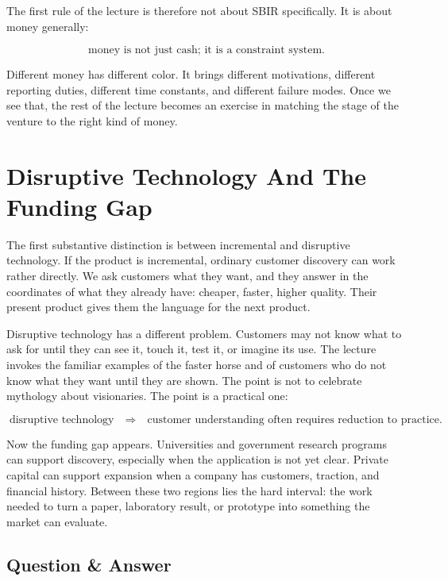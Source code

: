 The first rule of the lecture is therefore not about SBIR specifically. It is about money generally:

\begin{equation}
\text{money is not just cash; it is a constraint system.}
\end{equation}

Different money has different color. It brings different motivations, different reporting duties, different time constants, and different failure modes. Once we see that, the rest of the lecture becomes an exercise in matching the stage of the venture to the right kind of money.

\section{Disruptive Technology And The Funding Gap}

The first substantive distinction is between incremental and disruptive technology. If the product is incremental, ordinary customer discovery can work rather directly. We ask customers what they want, and they answer in the coordinates of what they already have: cheaper, faster, higher quality. Their present product gives them the language for the next product.

Disruptive technology has a different problem. Customers may not know what to ask for until they can see it, touch it, test it, or imagine its use. The lecture invokes the familiar examples of the faster horse and of customers who do not know what they want until they are shown. The point is not to celebrate mythology about visionaries. The point is a practical one:

\begin{equation}
\text{disruptive technology}
\quad\Longrightarrow\quad
\text{customer understanding often requires reduction to practice.}
\end{equation}

Now the funding gap appears. Universities and government research programs can support discovery, especially when the application is not yet clear. Private capital can support expansion when a company has customers, traction, and financial history. Between these two regions lies the hard interval: the work needed to turn a paper, laboratory result, or prototype into something the market can evaluate.

\subsection{Question \& Answer}

